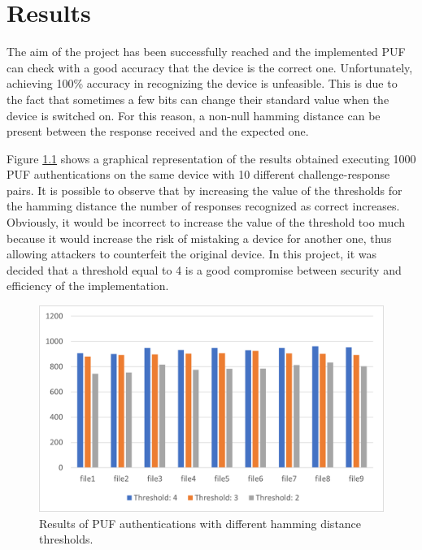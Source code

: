 \chapter{Results}

The aim of the project has been successfully reached and the implemented PUF can check with a good accuracy that the device is the correct one.
Unfortunately, achieving 100\% accuracy in recognizing the device is unfeasible. This is due to the fact that sometimes a few bits can change their standard value when the device is switched on.
For this reason, a non-null hamming distance can be present between the response received and the expected one.

Figure \ref{fig:Results} shows a graphical representation of the results obtained executing 1000 PUF authentications on the same device with 10 different challenge-response pairs.
It is possible to observe that by increasing the value of the thresholds for the hamming distance the number of responses recognized as correct increases.
Obviously, it would be incorrect to increase the value of the threshold too much because it would increase the risk of mistaking a device for another one, thus allowing attackers to counterfeit the original device. In this project, it was decided that a threshold equal to 4 is a good compromise between security and efficiency of the implementation.

\begin{figure}[tb]
\includegraphics[width=\textwidth]{images/results.png}
\caption{Results of PUF authentications with different hamming distance thresholds. }
\label{fig:Results} %
\end{figure}


